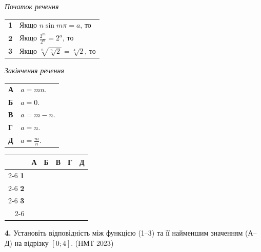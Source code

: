 \documentclass[14pt]{extarticle}
\newcommand{\answerGrid}{
    \begingroup
    \setlength{\tabcolsep}{4pt}
    \renewcommand{\arraystretch}{1.2}
    \small
    \begin{tabular}{r|c|c|c|c|c|}
         \multicolumn{1}{c}{} & \multicolumn{1}{c}{\textbf{А}} & \multicolumn{1}{c}{\textbf{Б}} & \multicolumn{1}{c}{\textbf{В}} & \multicolumn{1}{c}{\textbf{Г}} & \multicolumn{1}{c}{\textbf{Д}} \\ \cline{2-6}
         \textbf{1} & & & & & \\ \cline{2-6}
         \textbf{2} & & & & & \\ \cline{2-6}
         \textbf{3} & & & & & \\ \cline{2-6}
    \end{tabular}
    \endgroup
}
\newcommand{\nmtyear}[1]{\hfill{\small\color{yearcolor}(НМТ #1)}}
\begin{document}
\noindent
\begin{minipage}[t]{0.50\textwidth}
    \textit{Початок речення} \par \vspace{0.2cm}
    \begin{tabular}{@{}p{0.5cm} l@{}}
    \textbf{1} & Якщо $n \sin m\pi = a$, то \\[0.4cm]
    \textbf{2} & \colorbox{yellow!30}{Якщо $\displaystyle\frac{2^m}{2^n} = 2^a$, то} \\[0.6cm]
    \textbf{3} & Якщо $\sqrt[n]{\sqrt[n]{2}} = \sqrt[4]{2}$, то \\
    \end{tabular}
\end{minipage}%
\hfill
\begin{minipage}[t]{0.45\textwidth}
    \textit{Закінчення речення} \par \vspace{0.2cm}
    \begin{tabular}{@{}p{0.5cm} p{6cm}@{}}
    \textbf{А} & $a = mn$. \\[0.2cm]
    \textbf{Б} & $a = 0$. \\[0.2cm]
    \textbf{В} & $a = m - n$. \\[0.2cm]
    \textbf{Г} & $a = n$. \\[0.2cm]
    \textbf{Д} & $a = \displaystyle\frac{m}{n}$. \\
    \end{tabular}
\end{minipage}
\vspace{0.3cm}

\answerGrid
\vspace{0.7cm}

\noindent\textbf{4.} Установіть відповідність між функцією (1–3) та її найменшим значенням (А–Д) на відрізку $[0; 4]$. \nmtyear{2023}
\vspace{0.3cm}
\end{document}
